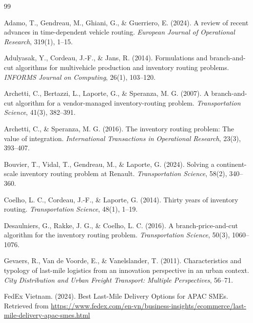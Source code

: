 \documentclass[12pt,a4paper]{article}
\begin{document}
\begin{thebibliography}{99}

Adamo, T., Gendreau, M., Ghiani, G., \& Guerriero, E. (2024).
A review of recent advances in time-dependent vehicle routing.
\textit{European Journal of Operational Research}, 319(1), 1--15.

Adulyasak, Y., Cordeau, J.-F., \& Jans, R. (2014).
Formulations and branch-and-cut algorithms for multivehicle production and inventory routing problems.
\textit{INFORMS Journal on Computing}, 26(1), 103--120.

Archetti, C., Bertazzi, L., Laporte, G., \& Speranza, M. G. (2007).
A branch-and-cut algorithm for a vendor-managed inventory-routing problem.
\textit{Transportation Science}, 41(3), 382--391.

Archetti, C., \& Speranza, M. G. (2016).
The inventory routing problem: The value of integration.
\textit{International Transactions in Operational Research}, 23(3), 393--407.

Bouvier, T., Vidal, T., Gendreau, M., \& Laporte, G. (2024).
Solving a continent-scale inventory routing problem at Renault.
\textit{Transportation Science}, 58(2), 340--360.

Coelho, L. C., Cordeau, J.-F., \& Laporte, G. (2014).
Thirty years of inventory routing.
\textit{Transportation Science}, 48(1), 1--19.

Desaulniers, G., Rakke, J. G., \& Coelho, L. C. (2016).
A branch-price-and-cut algorithm for the inventory routing problem.
\textit{Transportation Science}, 50(3), 1060--1076.

Gevaers, R., Van de Voorde, E., \& Vanelslander, T. (2011).
Characteristics and typology of last-mile logistics from an innovation perspective in an urban context.
\textit{City Distribution and Urban Freight Transport: Multiple Perspectives}, 56--71.

FedEx Vietnam. (2024).
Best Last-Mile Delivery Options for APAC SMEs.
Retrieved from \url{https://www.fedex.com/en-vn/business-insights/ecommerce/last-mile-delivery-apac-smes.html}


\end{thebibliography}
\end{document}
